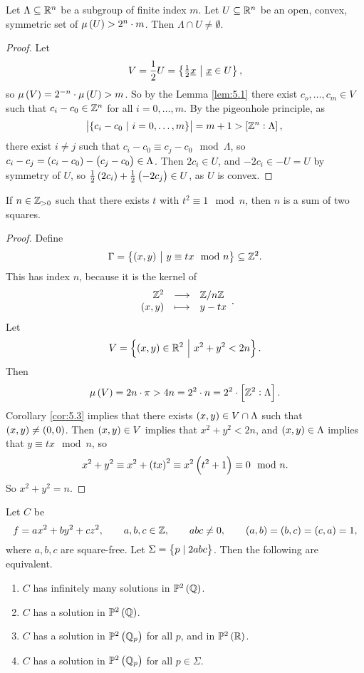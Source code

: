 \begin{corollary}
\label{cor:5.3}
Let $ \Lambda \subseteq \mathbb{R}^n $ be a subgroup of finite index $ m $. Let $ U \subseteq \mathbb{R}^n $ be an open, convex, symmetric set of $ \mu\br{U} > 2^n \cdot m $. Then $ \Lambda \cap U \ne \emptyset $.
\end{corollary}

\begin{proof}
Let
$$ V = \dfrac{1}{2}U = \cbr{\tfrac{1}{2}\underline{x} \st \underline{x} \in U}, $$
so $ \mu\br{V} = 2^{-n} \cdot \mu\br{U} > m $. So by the Lemma \ref{lem:5.1} there exist $ c_o, \dots, c_m \in V $ such that $ c_i - c_0 \in \mathbb{Z}^n $ for all $ i = 0, \dots, m $. By the pigeonhole principle, as
$$ \abs{\cbr{c_i - c_0 \st i = 0, \dots, m}} = m + 1 > \sbr{\ZZ^n : \Lambda}, $$
there exist $ i \ne j $ such that $ c_i - c_0 \equiv c_j - c_0 \mod \Lambda $, so $ c_i - c_j = \br{c_i - c_0} - \br{c_j - c_0} \in \Lambda $. Then $ 2c_i \in U $, and $ -2c_i \in -U = U $ by symmetry of $ U $, so $ \tfrac{1}{2}\br{2c_i} + \tfrac{1}{2}\br{-2c_j} \in U $, as $ U $ is convex.
\end{proof}

\begin{theorem}
If $ n \in \mathbb{Z}_{> 0} $ such that there exists $ t $ with $ t^2 \equiv 1 \mod n $, then $ n $ is a sum of two squares.
\end{theorem}

\begin{proof}
Define
$$ \Gamma = \cbr{\br{x, y} \st y \equiv tx \mod n} \subseteq \ZZ^2. $$
This has index $ n $, because it is the kernel of
$$ \function{\ZZ^2}{\ZZ / n\ZZ}{\br{x, y}}{y - tx}. $$
Let
$$ V = \cbr{\br{x, y} \in \RR^2 \st x^2 + y^2 < 2n}. $$
Then
$$ \mu\br{V} = 2n \cdot \pi > 4n = 2^2 \cdot n = 2^2 \cdot \sbr{\ZZ^2 : \Lambda}. $$
Corollary \ref{cor:5.3} implies that there exists $ \br{x, y} \in V \cap \Lambda $ such that $ \br{x, y} \ne \br{0, 0} $. Then $ \br{x, y} \in V $ implies that $ x^2 + y^2 < 2n $, and $ \br{x, y} \in \Lambda $ implies that $ y \equiv tx \mod n $, so
$$ x^2 + y^2 \equiv x^2 + \br{tx}^2 \equiv x^2\br{t^2 + 1} \equiv 0 \mod n. $$
So $ x^2 + y^2 = n $.
\end{proof}


\begin{theorem}
Let $ C $ be
$$ f = ax^2 + by^2 + cz^2, \qquad a, b, c \in \ZZ, \qquad abc \ne 0, \qquad \br{a, b} = \br{b, c} = \br{c, a} = 1, $$
where $ a, b, c $ are square-free. Let $ \Sigma = \cbr{p \mid 2abc} $. Then the following are equivalent.
\begin{enumerate}
\item $ C $ has infinitely many solutions in $ \PP^2\br{\QQ} $.
\item $ C $ has a solution in $ \PP^2\br{\QQ} $.
\item $ C $ has a solution in $ \PP^2\br{\QQ_p} $ for all $ p $, and in $ \PP^2\br{\RR} $.
\item $ C $ has a solution in $ \PP^2\br{\QQ_p} $ for all $ p \in \Sigma $.
\end{enumerate}
\end{theorem}

